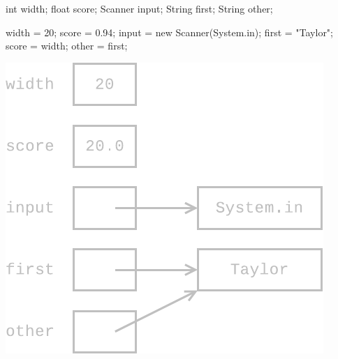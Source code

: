 \begin{multicols}{2}

\begin{javalst}
int width;
float score;
Scanner input;
String first;
String other;

width = 20;
score = 0.94;
input = new Scanner(System.in);
first = "Taylor";
score = width;
other = first;
\end{javalst}

\columnbreak

\begin{answer}
\includegraphics{CS1/reference2.pdf}
\end{answer}

\end{multicols}
